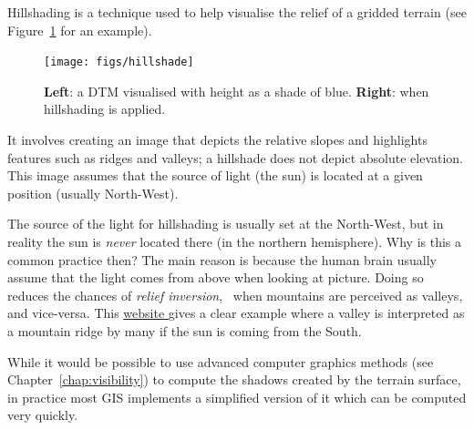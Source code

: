 Hillshading is a technique used to help visualise the relief of a gridded terrain (see Figure~\ref{fig:hillshade} for an example).
\begin{figure}
  \centering
  \texttt{[image: figs/hillshade]}
  \caption{\textbf{Left}: a DTM visualised with height as a shade of blue. \textbf{Right}: when hillshading is applied.}%
\label{fig:hillshade}
\end{figure}
It involves creating an image that depicts the relative slopes and highlights features such as ridges and valleys; a hillshade does not depict absolute elevation.
This image assumes that the source of light (the sun) is located at a given position (usually North-West).

\begin{floatbox}
  \begin{kaobox-practice}[frametitle=\faCog\ Why does the sunlight come from the North-West?]
    The source of the light for hillshading is usually set at the North-West, but in reality the sun is \emph{never} located there (in the northern hemisphere).
    Why is this a common practice then?
    The main reason is because the human brain usually assume that the light comes from above when looking at picture.
    Doing so reduces the chances of \emph{relief inversion}, \ie\ when mountains are perceived as valleys, and vice-versa.
    This \href{https://ramblemaps.com/why-does-sunlight-come-from-north}{website \faExternalLink} gives a clear example where a valley is interpreted as a mountain ridge by many if the sun is coming from the South.
  \end{kaobox-practice}
\end{floatbox}

While it would be possible to use advanced computer graphics methods (see Chapter~\ref{chap:visibility}) to compute the shadows created by the terrain surface, in practice most GIS implements a simplified version of it which can be computed very quickly.

